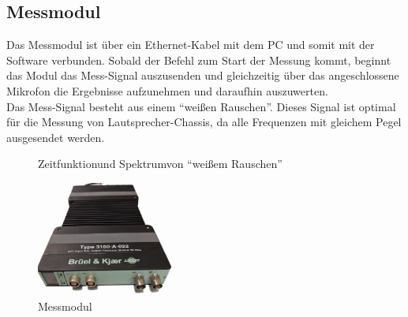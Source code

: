 \newpage
\subsection*{Messmodul}\label{subsec:4.1.2}
Das Messmodul ist über ein Ethernet-Kabel mit dem PC und somit mit der Software verbunden.
Sobald der Befehl zum Start der Messung kommt, beginnt das Modul das Mess-Signal auszusenden und gleichzeitig über das angeschlossene Mikrofon die Ergebnisse aufzunehmen und daraufhin auszuwerten.
\\
Das Mess-Signal besteht aus einem \enquote{weißen Rauschen}.
Dieses Signal ist optimal für die Messung von Lautsprecher-Chassis, da alle Frequenzen mit gleichem Pegel ausgesendet werden.
\begin{figure} [H]
	\centering
	\caption[Zeitfunktion und Spektrum von \enquote{weißem Rauschen}]{Zeitfunktion\footnotemark und Spektrum\footnotemark von \enquote{weißem Rauschen}}
	\label{fig:4.1.2.1}
\end{figure}
\begin{figure} [H]
	\centering
	\includegraphics[width=0.4\textwidth]{img/LSMessung/modul_front.png}
	\caption{Messmodul}
	\label{fig:4.1.2.2}
\end{figure}

